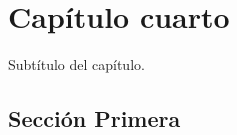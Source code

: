 \chapter{Capítulo cuarto}
    Subtítulo del capítulo.
    \section{Sección Primera}
        \lipsum[9]